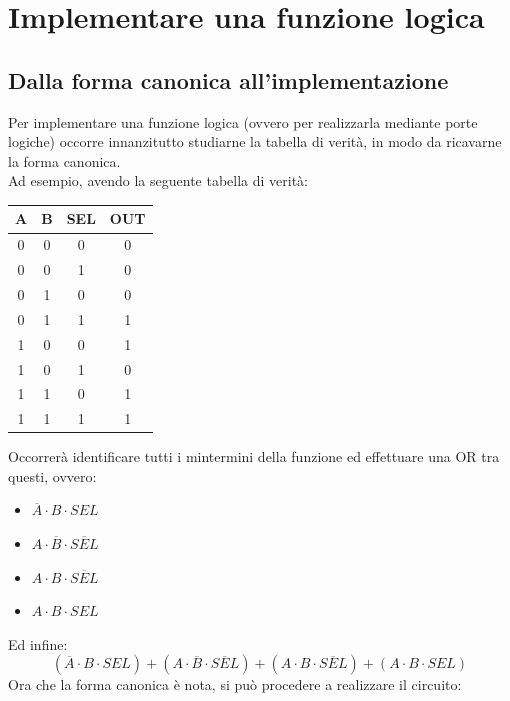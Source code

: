 \documentclass[12pt]{article}
\begin{document}
\section{Implementare una funzione logica}
\subsection{Dalla forma canonica all'implementazione}\label{sec:implem_canonica}
Per implementare una funzione logica (ovvero per realizzarla mediante porte logiche) occorre innanzitutto studiarne la tabella di verità, in modo da ricavarne la forma canonica.\\
Ad esempio, avendo la seguente tabella di verità:\\
\begin{center}
    \begin{tabular}{|| c c c | c ||}
        \hline
        A & B & SEL & OUT\\
        \hline
        0 & 0 & 0 & 0\\
        \hline
        0 & 0 & 1 & 0\\
        \hline
        0 & 1 & 0 & 0\\
        \hline
        0 & 1 & 1 & 1\\
        \hline
        1 & 0 & 0 & 1\\
        \hline
        1 & 0 & 1 & 0\\
        \hline
        1 & 1 & 0 & 1\\
        \hline
        1 & 1 & 1 & 1\\
        \hline
    \end{tabular}
\end{center}
Occorrerà identificare tutti i mintermini della funzione ed effettuare una OR tra questi, ovvero:
\begin{itemize}
    \item $\overline{A} \cdot B \cdot SEL$
    \item $A \cdot \overline{B} \cdot \overline{SEL}$
    \item $A \cdot B \cdot \overline{SEL}$
    \item $A \cdot B \cdot SEL$
\end{itemize}
Ed infine:
\[
    (\overline{A} \cdot B \cdot SEL) + (A \cdot \overline{B} \cdot \overline{SEL}) + (A \cdot B \cdot \overline{SEL}) + (A \cdot B \cdot SEL)
\]
Ora che la forma canonica è nota, si può procedere a realizzare il circuito:
\end{document}
